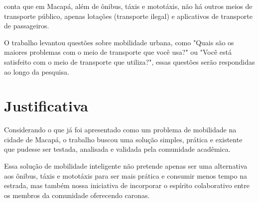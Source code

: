  conta que em Macapá, além de ônibus, táxis e mototáxis, não há outros meios de transporte público, apenas lotações (transporte ilegal) e aplicativos de transporte de passageiros.

O trabalho levantou questões sobre mobilidade urbana, como "Quais são os maiores problemas com o meio de transporte que você usa?" ou "Você está satisfeito com o meio de transporte que utiliza?", essas questões serão respondidas ao longo da pesquisa.






\section{Justificativa}



Considerando o que já foi apresentado como um problema de mobilidade na cidade de Macapá, o trabalho buscou uma solução simples, prática e existente que pudesse ser testada, analisada e validada pela comunidade acadêmica.


Essa solução de mobilidade inteligente não pretende apenas ser uma alternativa aos ônibus, táxis e mototáxis para ser mais prática e consumir menos tempo na estrada, mas também nossa iniciativa de incorporar o espírito colaborativo entre os membros da comunidade oferecendo caronas.




